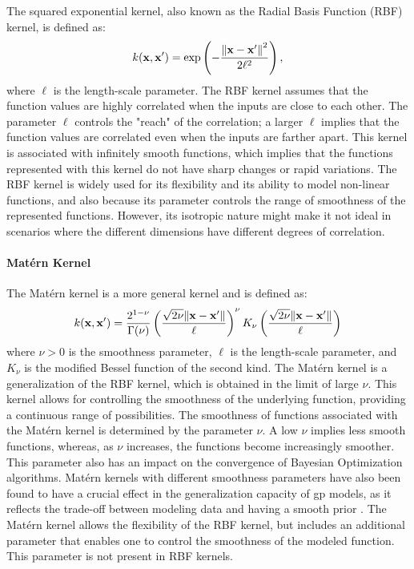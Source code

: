 The squared exponential kernel, also known as the Radial Basis Function (RBF) kernel, is defined as:
\[ k(\mathbf{x}, \mathbf{x}^\prime) = \exp\left(-\frac{\norm{\mathbf{x} - \mathbf{x}^\prime}^2}{2\ell^2}\right),\]
where $\ell$ is the length-scale parameter. The RBF kernel assumes that the function values are highly correlated when the inputs are close to each other. The parameter $\ell$ controls the "reach" of the correlation; a larger $\ell$ implies that the function values are correlated even when the inputs are farther apart. This kernel is associated with infinitely smooth functions, which implies that the functions represented with this kernel do not have sharp changes or rapid variations. The RBF kernel is widely used for its flexibility and its ability to model non-linear functions, and also because its parameter controls the range of smoothness of the represented functions. However, its isotropic nature might make it not ideal in scenarios where the different dimensions have different degrees of correlation.

\paragraph{Mat\'ern Kernel}

The Mat\'ern kernel is a more general kernel and is defined as:
\[ k(\mathbf{x}, \mathbf{x}^\prime) = \frac{2^{1-\nu}}{\Gamma(\nu)}\left(\frac{\sqrt{2\nu}\norm{\mathbf{x}-\mathbf{x}^\prime}}{\ell}\right)^\nu K_\nu\left(\frac{\sqrt{2\nu}\norm{\mathbf{x}-\mathbf{x}^\prime}}{\ell}\right)\]
where $\nu > 0$ is the smoothness parameter, $\ell$ is the length-scale parameter, and $K_\nu$ is the modified Bessel function of the second kind. The Mat\'ern kernel is a generalization of the RBF kernel, which is obtained in the limit of large $\nu$.  This kernel allows for controlling the smoothness of the underlying function, providing a continuous range of possibilities. The smoothness of functions associated with the Mat\'ern kernel is determined by the parameter $\nu$. A low $\nu$ implies less smooth functions, whereas, as $\nu$ increases, the functions become increasingly smoother. This parameter also has an impact on the convergence of Bayesian Optimization algorithms. Mat\'ern kernels with different smoothness parameters have also been found to have a crucial effect in the generalization capacity of \ac{gp} models, as it reflects the trade-off between modeling data and having a smooth prior \citep{rasmussen2006gaussian}. The Mat\'ern kernel allows the flexibility of the RBF kernel, but includes an additional parameter that enables one to control the smoothness of the modeled function. This parameter is not present in RBF kernels.

